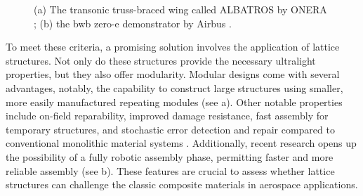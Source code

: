 \begin{figure}
    \hspace*{\fill}
    \hfill
    \hspace*{\fill}
    \caption{(a) The transonic truss-braced wing called ALBATROS by ONERA \cite{carrier_investigation_2012,carrier_multidisciplinary_2021}; (b) the \acrfull{bwb} zero-e demonstrator by Airbus \cite{noauthor_airbus_2021}.}
    \label{fig:01_concepts}
\end{figure}

To meet these criteria, a promising solution involves the application of lattice structures. Not only do these structures provide the necessary ultralight properties, but they also offer modularity. Modular designs come with several advantages, notably, the capability to construct large structures using smaller, more easily manufactured repeating modules (see a). Other notable properties include on-field reparability, improved damage resistance, fast assembly for temporary structures, and stochastic error detection and repair compared to conventional monolithic material systems . Additionally, recent research opens up the possibility of a fully robotic assembly phase, permitting faster and more reliable assembly (see b). These features are crucial to assess whether lattice structures can challenge the classic composite materials in aerospace applications.

